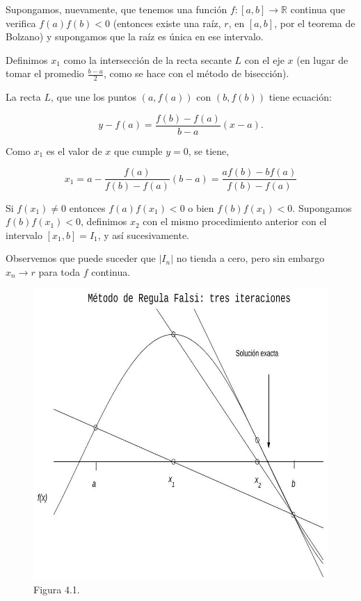 \documentclass[10pt]{book}
\begin{document}
Supongamos, nuevamente, que tenemos una función $f:[a, b] \rightarrow \mathbb{R}$ continua que verifica $f(a) f(b)<0$ (entonces existe una raíz, $r$, en $[a, b]$, por el teorema de Bolzano) y supongamos que la raíz es única en ese intervalo.

Definimos $x_{1}$ como la intersección de la recta secante $L$ con el eje $x$ (en lugar de tomar el promedio $\frac{b-a}{2}$, como se hace con el método de bisección).

La recta $L$, que une los puntos $(a, f(a))$ con $(b, f(b))$ tiene ecuación:

$$
y-f(a)=\frac{f(b)-f(a)}{b-a}(x-a) .
$$

Como $x_{1}$ es el valor de $x$ que cumple $y=0$, se tiene,

$$
x_{1}=a-\frac{f(a)}{f(b)-f(a)}(b-a)=\frac{a f(b)-b f(a)}{f(b)-f(a)}
$$

Si $f\left(x_{1}\right) \neq 0$ entonces $f(a) f\left(x_{1}\right)<0$ o bien $f(b) f\left(x_{1}\right)<0$. Supongamos $f(b) f\left(x_{1}\right)<0$, definimos $x_{2}$ con el mismo procedimiento anterior con el intervalo $\left[x_{1}, b\right]=I_{1}$, y así sucesivamente.

Observemos que puede suceder que $\left|I_{n}\right|$ no tienda a cero, pero sin embargo $x_{n} \rightarrow r$ para toda $f$ continua.

\begin{figure}[h]
\begin{center}
  \includegraphics[width=\textwidth]{2025_09_05_3888c9ac96bd653d96b4g-073}
\captionsetup{labelformat=empty}
\caption{Figura 4.1.}
\end{center}
\end{figure}
\end{document}
